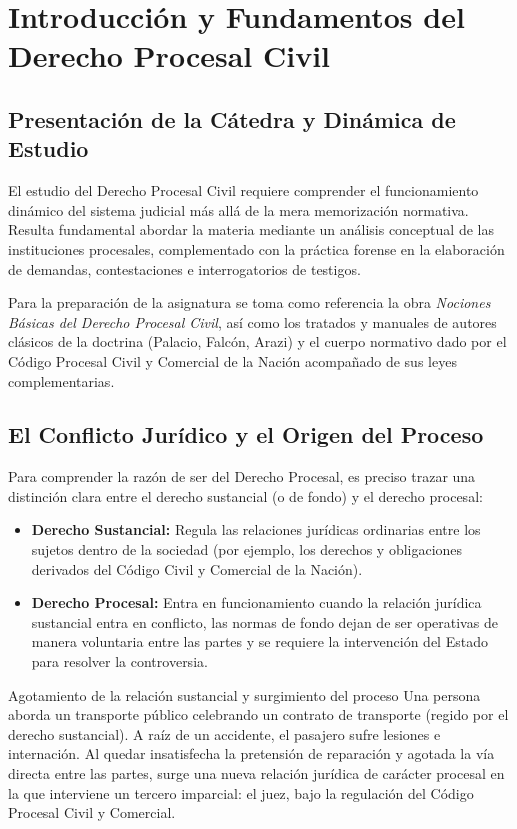 \documentclass[12pt,oneside]{book}
\begin{document}
\chapter{Introducción y Fundamentos del Derecho Procesal Civil}

\section{Presentación de la Cátedra y Dinámica de Estudio}
El estudio del Derecho Procesal Civil requiere comprender el funcionamiento dinámico del sistema judicial más allá de la mera memorización normativa. Resulta fundamental abordar la materia mediante un análisis conceptual de las instituciones procesales, complementado con la práctica forense en la elaboración de demandas, contestaciones e interrogatorios de testigos.

Para la preparación de la asignatura se toma como referencia la obra \textit{Nociones Básicas del Derecho Procesal Civil}, así como los tratados y manuales de autores clásicos de la doctrina (Palacio, Falcón, Arazi) y el cuerpo normativo dado por el Código Procesal Civil y Comercial de la Nación acompañado de sus leyes complementarias.

\section{El Conflicto Jurídico y el Origen del Proceso}
Para comprender la razón de ser del Derecho Procesal, es preciso trazar una distinción clara entre el derecho sustancial (o de fondo) y el derecho procesal:
\begin{itemize}
    \item \textbf{Derecho Sustancial:} Regula las relaciones jurídicas ordinarias entre los sujetos dentro de la sociedad (por ejemplo, los derechos y obligaciones derivados del Código Civil y Comercial de la Nación).
    \item \textbf{Derecho Procesal:} Entra en funcionamiento cuando la relación jurídica sustancial entra en conflicto, las normas de fondo dejan de ser operativas de manera voluntaria entre las partes y se requiere la intervención del Estado para resolver la controversia.
\end{itemize}

\begin{example}{Agotamiento de la relación sustancial y surgimiento del proceso}
Una persona aborda un transporte público celebrando un contrato de transporte (regido por el derecho sustancial). A raíz de un accidente, el pasajero sufre lesiones e internación. Al quedar insatisfecha la pretensión de reparación y agotada la vía directa entre las partes, surge una nueva relación jurídica de carácter procesal en la que interviene un tercero imparcial: el juez, bajo la regulación del Código Procesal Civil y Comercial.
\end{example}
\end{document}
